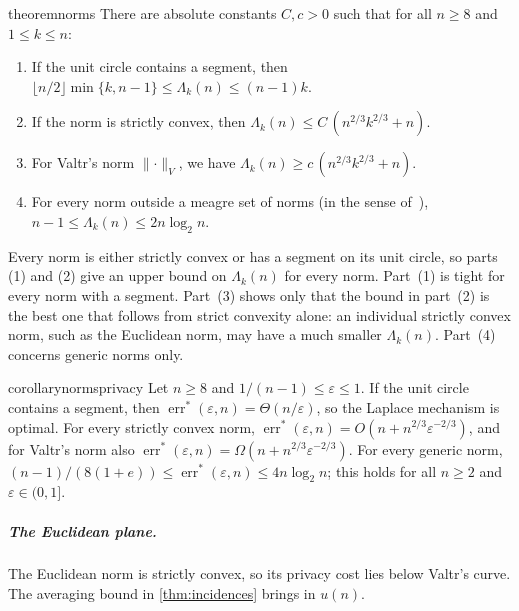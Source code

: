 \documentclass[anonymous,a4paper,USenglish,cleveref,autoref,thm-restate]{socg-lipics-v2021}
\newcommand{\eps}{\varepsilon}
\newcommand{\Lam}{\Lambda}
\newcommand{\errs}{\operatorname{err}^*}
\newcommand{\nrm}[1]{\lVert #1\rVert}
\begin{document}
\begin{restatable}{theorem}{norms}
\label{thm:norms}
There are absolute constants $C,c>0$ such that for all $n\ge 8$ and $1\le k\le n$:
\begin{enumerate}
\item If the unit circle contains a segment, then $\lfloor n/2\rfloor\min\{k,n-1\}\le\Lam_k(n)\le (n-1)k$.
\item If the norm is strictly convex, then $\Lam_k(n)\le C\,(n^{2/3}k^{2/3}+n)$.
\item For Valtr's norm $\nrm{\cdot}_V$, we have $\Lam_k(n)\ge c\,(n^{2/3}k^{2/3}+n)$.
\item For every norm outside a meagre set of norms (in the sense of~\cite{ABS23}), $n-1\le\Lam_k(n)\le 2n\log_2 n$.
\end{enumerate}
\end{restatable}

Every norm is either strictly convex or has a segment on its unit circle, so parts (1) and (2) give an upper bound on $\Lam_k(n)$ for every norm. Part~(1) is tight for every norm with a segment. Part~(3) shows only that the bound in part~(2) is the best one that follows from strict convexity alone: an individual strictly convex norm, such as the Euclidean norm, may have a much smaller $\Lam_k(n)$. Part~(4) concerns generic norms only.

\begin{restatable}{corollary}{normsprivacy}
\label{cor:norms-privacy}
Let $n\ge8$ and $1/(n-1)\le\eps\le1$. If the unit circle contains a segment, then $\errs(\eps,n)=\Theta(n/\eps)$, so the Laplace mechanism is optimal. For every strictly convex norm, $\errs(\eps,n)=O(n+n^{2/3}\eps^{-2/3})$, and for Valtr's norm also $\errs(\eps,n)=\Omega(n+n^{2/3}\eps^{-2/3})$. For every generic norm, $(n-1)/(8(1+e))\le\errs(\eps,n)\le4n\log_2n$; this holds for all $n\ge2$ and $\eps\in(0,1]$.
\end{restatable}

\subparagraph*{The Euclidean plane.}
The Euclidean norm is strictly convex, so its privacy cost lies below Valtr's curve. The averaging bound in \cref{thm:incidences} brings in $u(n)$.
\end{document}
